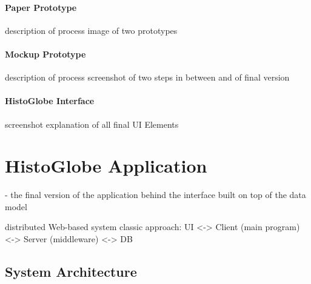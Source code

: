 \paragraph{Paper Prototype} %
\label{par:paper_prototype}

description of process
image of two prototypes


\paragraph{Mockup Prototype} %
\label{par:mockup_prototype}

description of process
screenshot of two steps in between and of final version


\paragraph{HistoGlobe Interface} %
\label{par:histoglobe_interface}

screenshot
explanation of all final UI Elements





\section{HistoGlobe Application} %
\label{sec:histoglobe_application}

- the final version of the application behind the interface built on top of the data model

distributed Web-based system
classic approach: UI <-> Client (main program) <-> Server (middleware) <-> DB

\subsection{System Architecture} %
\label{sub:system_architecture}


